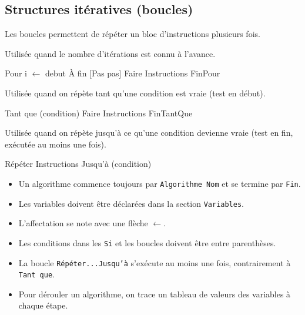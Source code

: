 \subsection{Structures itératives (boucles)}
Les boucles permettent de répéter un bloc d'instructions plusieurs fois.

\begin{definition}
Utilisée quand le nombre d'itérations est connu à l'avance.
\begin{algo}
Pour i $\leftarrow$ debut À fin [Pas pas] Faire
    Instructions
FinPour
\end{algo}
\end{definition}

\begin{definition}
Utilisée quand on répète tant qu'une condition est vraie (test en début).
\begin{algo}
Tant que (condition) Faire
    Instructions
FinTantQue
\end{algo}
\end{definition}

\begin{definition}
Utilisée quand on répète jusqu'à ce qu'une condition devienne vraie (test en fin, exécutée au moins une fois).
\begin{algo}
Répéter
    Instructions
Jusqu'à (condition)
\end{algo}
\end{definition}

\begin{aretenir}
\begin{itemize}
    \item Un algorithme commence toujours par \texttt{Algorithme Nom} et se termine par \texttt{Fin}.
    \item Les variables doivent être déclarées dans la section \texttt{Variables}.
    \item L'affectation se note avec une flèche $\leftarrow$.
    \item Les conditions dans les \texttt{Si} et les boucles doivent être entre parenthèses.
    \item La boucle \texttt{Répéter...Jusqu'à} s'exécute au moins une fois, contrairement à \texttt{Tant que}.
    \item Pour dérouler un algorithme, on trace un tableau de valeurs des variables à chaque étape.
\end{itemize}
\end{aretenir}

